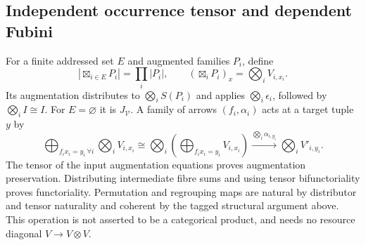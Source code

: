 \documentclass[11pt,a4paper]{article}
\theoremstyle{definition}
\newcommand{\V}{\mathcal V}
\begin{document}
\subsection{Independent occurrence tensor and dependent Fubini}
For a finite addressed set $E$ and augmented families $P_i$, define
\begin{equation}\label{eq:tensor}
 \left|\boxtimes_{i\in E}P_i\right|=\prod_i|P_i|,\qquad
 \left(\boxtimes_iP_i\right)_x=\bigotimes_iV_{i,x_i}.
\end{equation}
Its augmentation distributes to $\bigotimes_iS(P_i)$ and applies
$\bigotimes_i\epsilon_i$, followed by $\bigotimes_iI\cong I$.
For $E=\varnothing$ it is $J_\V$. A family of arrows $(f_i,\alpha_i)$ acts
at a target tuple $y$ by
\begin{equation}\label{eq:tensormap}
 \bigoplus_{f_ix_i=y_i\ \forall i}\bigotimes_iV_{i,x_i}
 \cong\bigotimes_i\left(\bigoplus_{f_ix_i=y_i}V_{i,x_i}\right)
 \xrightarrow{\bigotimes_i\alpha_{i,y_i}}\bigotimes_iV'_{i,y_i}.
\end{equation}
The tensor of the input augmentation equations proves augmentation preservation.
Distributing intermediate fibre sums and using tensor bifunctoriality proves
functoriality. Permutation and regrouping maps are natural by distributor and
tensor naturality and coherent by the tagged structural argument above.
This operation is not asserted to be a categorical product, and needs no
resource diagonal $V\to V\otimes V$.
\end{document}
